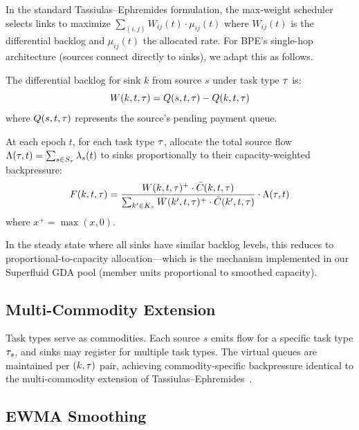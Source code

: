 In the standard Tassiulas--Ephremides formulation, the max-weight scheduler selects
links to maximize $\sum_{(i,j)} W_{ij}(t) \cdot \mu_{ij}(t)$ where $W_{ij}(t)$ is
the differential backlog and $\mu_{ij}(t)$ the allocated rate. For BPE's single-hop
architecture (sources connect directly to sinks), we adapt this as follows.

\begin{definition}
The differential backlog for sink $k$ from source $s$ under task type $\tau$ is:
\begin{equation}
W(k, t, \tau) = Q(s, t, \tau) - Q(k, t, \tau)
\end{equation}
where $Q(s, t, \tau)$ represents the source's pending payment queue.
\end{definition}

\begin{definition}
\label{def:maxweight}
At each epoch $t$, for each task type $\tau$, allocate the total source
flow $\Lambda(\tau, t) = \sum_{s \in S_\tau} \lambda_s(t)$ to sinks
proportionally to their capacity-weighted backpressure:
\begin{equation}
\label{eq:maxweight}
F(k, t, \tau) = \frac{W(k, t, \tau)^+ \cdot \bar{C}(k, t, \tau)}
{\sum_{k' \in K_\tau} W(k', t, \tau)^+ \cdot \bar{C}(k', t, \tau)}
\cdot \Lambda(\tau, t)
\end{equation}
where $x^+ = \max(x, 0)$.
\end{definition}

In the steady state where all sinks have similar backlog levels, this reduces to
proportional-to-capacity allocation---which is the mechanism implemented in our
Superfluid GDA pool (member units proportional to smoothed capacity).

\subsection{Multi-Commodity Extension}

Task types serve as commodities. Each source $s$ emits flow for a specific task
type $\tau_s$, and sinks may register for multiple task types. The virtual
queues are maintained per $(k, \tau)$ pair, achieving commodity-specific
backpressure identical to the multi-commodity extension of
Tassiulas--Ephremides~\cite{tassiulas1992stability}.

\subsection{EWMA Smoothing}
\label{sec:ewma}

